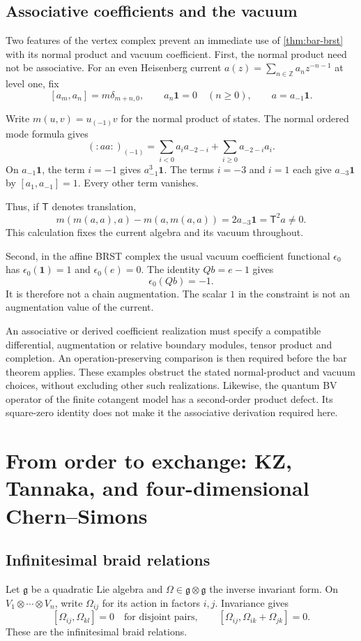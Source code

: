\section{Associative coefficients and the vacuum}
Two features of the vertex complex prevent an immediate use of
\cref{thm:bar-brst} with its normal product and vacuum coefficient.
First, the normal product need not be associative.
For an even Heisenberg current
$a(z)=\sum_{n\in\mathbb Z}a_nz^{-n-1}$ at level one, fix
\[
 [a_m,a_n]=m\delta_{m+n,0},
 \qquad a_n\mathbf1=0\quad(n\geq0),
 \qquad a=a_{-1}\mathbf1.
\]

Write $m(u,v)=u_{(-1)}v$ for the normal product of states.
The normal ordered mode formula gives
\[
 (:aa:)_{(-1)}
 =\sum_{i<0}a_i a_{-2-i}+\sum_{i\geq0}a_{-2-i}a_i.
\]
On $a_{-1}\mathbf1$, the term $i=-1$ gives
$a_{-1}^3\mathbf1$.
The terms $i=-3$ and $i=1$ each give $a_{-3}\mathbf1$
by $[a_1,a_{-1}]=1$.
Every other term vanishes.

Thus, if $\mathsf T$ denotes translation,
\[
 m(m(a,a),a)-m(a,m(a,a))
 =2a_{-3}\mathbf1=\mathsf T^2a\ne0.
\]
This calculation fixes the current algebra and its vacuum
throughout.

Second, in the affine BRST complex the usual vacuum coefficient
functional $\epsilon_0$ has
$\epsilon_0(\mathbf1)=1$ and $\epsilon_0(e)=0$.
The identity $Qb=e-1$ gives
\[
 \epsilon_0(Qb)=-1.
\]
It is therefore not a chain augmentation.
The scalar $1$ in the constraint is not an augmentation value
of the current.

An associative or derived coefficient realization must specify
a compatible differential, augmentation or relative boundary
modules, tensor product and completion.
An operation-preserving comparison is then required before the
bar theorem applies.
These examples obstruct the stated normal-product and vacuum
choices, without excluding other such realizations.
Likewise, the quantum BV operator of the finite cotangent model
has a second-order product defect.  Its square-zero identity
does not make it the associative derivation required here.

\chapter{From order to exchange: KZ, Tannaka, and four-dimensional Chern--Simons}\label{chap:exchange}

\section{Infinitesimal braid relations}
Let \(\mathfrak g\) be a quadratic Lie algebra and \(\Omega\in\mathfrak g\otimes\mathfrak g\) the inverse invariant form.  On \(V_1\otimes\cdots\otimes V_n\), write \(\Omega_{ij}\) for its action in factors \(i,j\).  Invariance gives
\[
 [\Omega_{ij},\Omega_{kl}]=0\quad\text{for disjoint pairs},
 \qquad
 [\Omega_{ij},\Omega_{ik}+\Omega_{jk}]=0.
\]
These are the infinitesimal braid relations.


